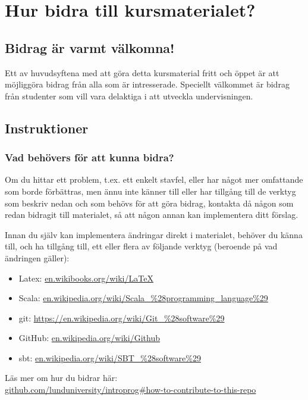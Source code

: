 
\chapter{Hur bidra till kursmaterialet?}\label{appendix:contrib}

\section{Bidrag är varmt välkomna!}

Ett av huvudsyftena med att göra detta kursmaterial fritt och öppet är att möjliggöra bidrag från alla som är intresserade. Speciellt välkommet är bidrag från studenter som vill vara delaktiga i att utveckla undervisningen.

\section{Instruktioner}

\subsection{Vad behövers för att kunna bidra?}

Om du hittar ett problem, t.ex. ett enkelt stavfel, eller har något mer omfattande som borde förbättras, men ännu inte känner till eller har tillgång till de verktyg som beskriv nedan och som behövs för att göra bidrag, kontakta då någon som redan bidragit till materialet, så att någon annan kan implementera ditt förslag.

Innan du själv kan implementera ändringar direkt i materialet, behöver du känna till, och ha tillgång  till, ett eller flera av följande verktyg (beroende på vad ändringen gäller):

\begin{itemize}[noitemsep]
\item Latex: \href{https://en.wikibooks.org/wiki/LaTeX}{en.wikibooks.org/wiki/LaTeX}
\item Scala: \href{https://en.wikipedia.org/wiki/Scala\_\%28programming_language\%29}{en.wikipedia.org/wiki/Scala\_\%28programming\_language\%29}
\item git: \href{https://en.wikipedia.org/wiki/Git\_\%28software\%29}{https://en.wikipedia.org/wiki/Git\_\%28software\%29}
\item GitHub: \href{https://en.wikipedia.org/wiki/Github}{en.wikipedia.org/wiki/Github}
\item sbt: \href{https://en.wikipedia.org/wiki/SBT\_\%28software\%29}{en.wikipedia.org/wiki/SBT\_\%28software\%29}
\end{itemize}
Läs mer om hur du bidrar här: \\ \href{https://github.com/lunduniversity/introprog#how-to-contribute-to-this-repo}{github.com/lunduniversity/introprog\#how-to-contribute-to-this-repo}



